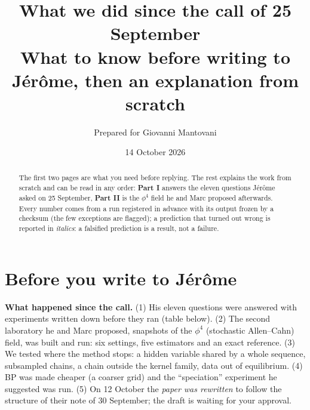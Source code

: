 \documentclass[11pt,a4paper]{article}
\title{\textbf{What we did since the call of 25 September}\\[0.3em]\large What to know before writing to Jérôme, then an explanation from scratch}
\author{Prepared for Giovanni Mantovani}
\date{14 October 2026}
\newcommand{\fals}[1]{{\small\itshape #1}}
\begin{document}
\maketitle
\vspace{-1.6em}

\begin{abstract}\noindent
The first two pages are what you need before replying. The rest explains the work from scratch and can be read in any order:
\textbf{Part I} answers the eleven questions Jérôme asked on 25 September, \textbf{Part II} is the $\phi^4$ field he and Marc proposed
afterwards. Every number comes from a run registered in advance with its output frozen by a checksum (the few exceptions are
flagged); a prediction that turned out wrong is reported in \fals{italics}: a falsified prediction is a result, not a failure.
\end{abstract}



\section*{Before you write to Jérôme}

\textbf{What happened since the call.} (1) His eleven questions were answered with experiments written down before they ran
(table below). (2) The second laboratory he and Marc proposed, snapshots of the $\phi^4$ (stochastic Allen--Cahn) field, was built
and run: six settings, five estimators and an exact reference. (3) We tested where the method stops: a hidden variable shared by a
whole sequence, subsampled chains, a chain outside the kernel family, data out of equilibrium. (4) BP was made cheaper (a coarser
grid) and the ``speciation'' experiment he suggested was run. (5) On 12 October the \emph{paper was rewritten} to follow the
structure of their note of 30 September; the draft is waiting for your approval.
\end{document}

